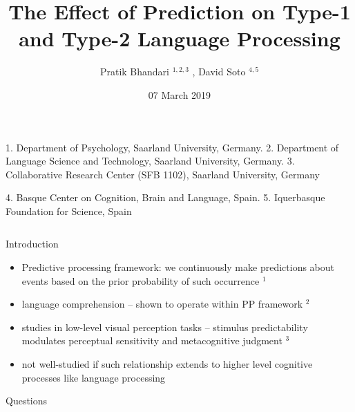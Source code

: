 \documentclass[final,12pt]{beamer}
\title{{The Effect of Prediction on Type-1 and Type-2 Language Processing}}
\author{Pratik Bhandari $^{1,2,3}$ ,  David Soto $^{4,5}$ } %
\institute[UdS]{UdS, SFB 1102, BCBL}
\date{07 March 2019}
\begin{document}
\begin{frame}[t]

\vspace{1.1em}
\begin{description}
  \item \tiny {1. Department of Psychology, Saarland University, Germany. 2. Department of Language Science and Technology, Saarland University, Germany. 3. Collaborative Research Center (SFB 1102), Saarland University, Germany}
  \centering
  \item \tiny {4. Basque Center on Cognition, Brain and Language, Spain. 5. Iquerbasque Foundation for Science, Spain}
  \centering
\end{description}

\begin{columns}[t]    
  \begin{column}{\halfpagecol}
  \vspace{-1em}
       \begin{block}{Introduction}
\vspace{-2.3cm}
\vspace{1.2em}
\begin{itemize}
  \item Predictive processing framework: we continuously make predictions about events based on the prior probability of such occurrence $^{1}$
  \item language comprehension -- shown to operate within PP framework $^{2}$
   \item studies in low-level visual perception tasks -- stimulus predictability modulates perceptual sensitivity and metacognitive judgment $^{3}$
   \item not well-studied if such relationship extends to higher level cognitive processes like language processing
\end{itemize}
\end{block}
    
    
    
   \vspace{-0.15em}
   
    \begin{block}{Questions}
      \vspace{-2.3cm}
      \vspace{1.2em} %
    

\end{block}
\end{column}
\end{columns}
\end{frame}
\end{document}
